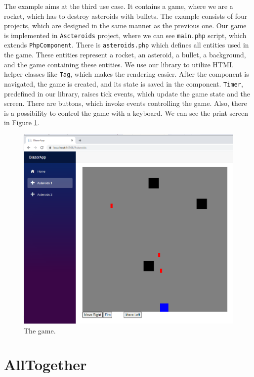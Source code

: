 The example aims at the third use case.
It contains a game, where we are a rocket, which has to destroy asteroids with bullets.
The example consists of four projects, which are designed in the same manner as the previous one.
Our game is implemented in \texttt{Ascteroids} project, where we can see \texttt{main.php} script, which extends \texttt{PhpComponent}.
There is \texttt{asteroids.php} which defines all entities used in the game.
These entities represent a rocket, an asteroid, a bullet, a background, and the game containing these entities.
We use our library to utilize HTML helper classes like \texttt{Tag}, which makes the rendering easier.
After the component is navigated, the game is created, and its state is saved in the component.
\texttt{Timer}, predefined in our library, raises tick events, which update the game state and the screen.
There are buttons, which invoke events controlling the game.
Also, there is a possibility to control the game with a keyboard.
We can see the print screen in Figure \ref{img28:game}.
\par
\begin{figure}[H]\centering
\includegraphics[scale=0.4]{./img/Asteroids}
\caption{The game.}
\label{img28:game}
\end{figure} 
\par
 

\section{AllTogether}